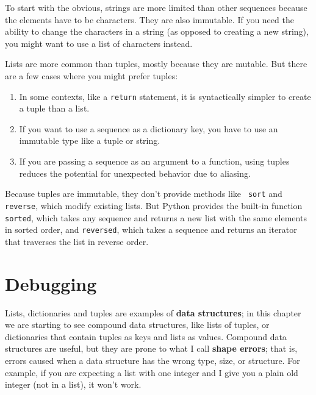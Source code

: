 \documentclass[10pt]{book}
\begin{document}
To start with the obvious, strings are more limited than other
sequences because the elements have to be characters.  They are
also immutable.  If you need the ability to change the characters
in a string (as opposed to creating a new string), you might
want to use a list of characters instead.

Lists are more common than tuples, mostly because they are mutable.
But there are a few cases where you might prefer tuples:

\begin{enumerate}

\item In some contexts, like a {\tt return} statement, it is
syntactically simpler to create a tuple than a list.

\item If you want to use a sequence as a dictionary key, you
have to use an immutable type like a tuple or string.

\item If you are passing a sequence as an argument to a function,
using tuples reduces the potential for unexpected behavior
due to aliasing.

\end{enumerate}

Because tuples are immutable, they don't provide methods like {\tt
  sort} and {\tt reverse}, which modify existing lists.  But Python
provides the built-in function {\tt sorted}, which takes any sequence
and returns a new list with the same elements in sorted order, and
{\tt reversed}, which takes a sequence and returns an iterator that
traverses the list in reverse order.
 


\section{Debugging}

Lists, dictionaries and tuples are examples of {\bf data
  structures}; in this chapter we are starting to see compound data
structures, like lists of tuples, or dictionaries that contain tuples
as keys and lists as values.  Compound data structures are useful, but
they are prone to what I call {\bf shape errors}; that is, errors
caused when a data structure has the wrong type, size, or structure.
For example, if you are expecting a list with one integer and I
give you a plain old integer (not in a list), it won't work.
\end{document}
